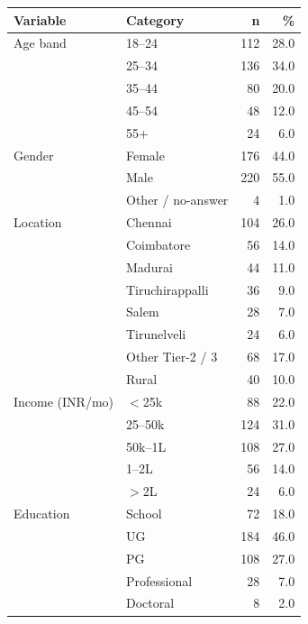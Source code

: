 \begin{tabularx}{\textwidth}{l X r r}
\toprule
\textbf{Variable} & \textbf{Category} & \textbf{n} & \textbf{\%}\\
\midrule
Age band       & 18--24 & 112 & 28.0 \\
               & 25--34 & 136 & 34.0 \\
               & 35--44 &  80 & 20.0 \\
               & 45--54 &  48 & 12.0 \\
               & 55+    &  24 &  6.0 \\
\midrule
Gender         & Female &176 & 44.0 \\
               & Male   & 220 & 55.0 \\
               & Other / no-answer &   4 &  1.0 \\
\midrule
Location       & Chennai            & 104 & 26.0 \\
               & Coimbatore         &  56 & 14.0 \\
               & Madurai            &  44 & 11.0 \\
               & Tiruchirappalli    &  36 &  9.0 \\
               & Salem              &  28 &  7.0 \\
               & Tirunelveli        &  24 &  6.0 \\
               & Other Tier-2 / 3   &  68 & 17.0 \\
               & Rural              &  40 & 10.0 \\
\midrule
Income (INR/mo)& $<$25k             &  88 & 22.0 \\
               & 25--50k            & 124 & 31.0 \\
               & 50k--1L            & 108 & 27.0 \\
               & 1--2L              &  56 & 14.0 \\
               & $>$2L              &  24 &  6.0 \\
\midrule
Education      & School             &  72 & 18.0 \\
               & UG                 & 184 & 46.0 \\
               & PG                 & 108 & 27.0 \\
               & Professional       &  28 &  7.0 \\
               & Doctoral           &   8 &  2.0 \\
\bottomrule
\end{tabularx}


